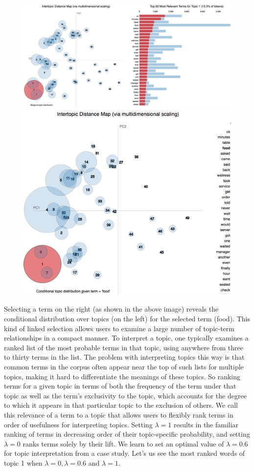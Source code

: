 \documentclass{neu_handout}
\begin{document}
\begin{figure}[h]
\centering
{
\includegraphics[width=0.4\linewidth]{second_image}
}
{
\includegraphics[width=0.4\linewidth]{third_image}
}
\end{figure}

Selecting a term on the right (as shown in the above image)  reveals the conditional distribution over topics (on the left) for the selected term (food). This kind of linked selection allows users to examine a large number of topic-term relationships in a compact manner.
To interpret a topic, one typically examines a ranked list of the most probable terms in that topic, using anywhere from three to thirty terms in the list. The problem with interpreting topics this way is that common terms in the corpus often appear near the top of such lists for multiple topics, making it hard to differentiate the meanings of these topics. So ranking terms for a given topic in terms of both the frequency of the term under that topic as well as the term’s exclusivity to the topic, which accounts for the degree to which it appears in that particular topic to the exclusion of others. We call this relevance of a term to a topic that allows users to flexibly rank terms in order of usefulness for interpreting topics. Setting $\lambda = 1$ results in the familiar ranking of terms in decreasing order of their topic-specific probability, and setting $\lambda = 0$ ranks terms solely by their lift. We learn to set an optimal value of $\lambda = 0.6$ for topic interpretation from a case study.
Let’s us see the most ranked words of topic 1 when $\lambda = 0, \lambda = 0.6$ and $\lambda = 1$.
\end{document}

